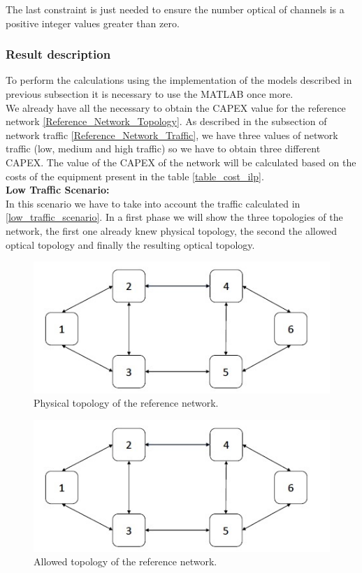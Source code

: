 The last constraint is just needed to ensure the number optical of channels is a positive integer values greater than zero.\\


\subsubsection{Result description}

To perform the calculations using the implementation of the models described in previous subsection it is necessary to use the MATLAB once more. \\
We already have all the necessary to obtain the CAPEX value for the reference network \ref{Reference_Network_Topology}. As described in the subsection of network traffic \ref{Reference_Network_Traffic}, we have three values of network traffic (low, medium and high traffic) so we have to obtain three different CAPEX.
The value of the CAPEX of the network will be calculated based on the costs of the equipment present in the table \ref{table_cost_ilp}.\\


\textbf{Low Traffic Scenario:}\\

In this scenario we have to take into account the traffic calculated in \ref{low_traffic_scenario}. In a first phase we will show the three topologies of the network, the first one already knew physical topology, the second the allowed optical topology and finally the resulting optical topology.

\begin{figure}[h!]
\centering
\includegraphics[width=12cm]{sdf/ilp/opaque_protection/figures/physical_opaque_protec_ref_low}
\caption{Physical topology of the reference network.}
\label{physical_protec_ref_low}
\end{figure}

\begin{figure}[h!]
\centering
\includegraphics[width=12cm]{sdf/ilp/opaque_protection/figures/allowed_opaque_protec_ref_low}
\caption{Allowed topology of the reference network.}
\label{allowed_protec_ref_low}
\end{figure}

